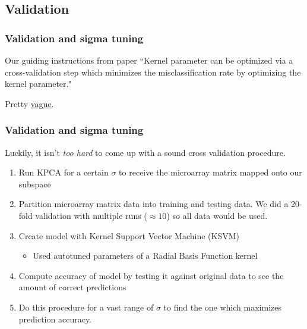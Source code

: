 \documentclass[serif]{beamer}
\begin{document}
	\subsection{Validation}
	\begin{frame}
		\frametitle{Validation and sigma tuning}
		\begin{block}{Our guiding instructions from paper}
		``Kernel parameter can be optimized via a cross-validation step 
		which minimizes the misclassification rate by optimizing the kernel parameter."
		\end{block}
		
		Pretty \underline{vague}.
	\end{frame}
	\begin{frame}
		\frametitle{Validation and sigma tuning}
		Luckily, it isn't \emph{too hard} to come up with a sound cross validation procedure.
		
		\begin{enumerate}
			\item Run KPCA for a certain $\sigma$ to receive the microarray matrix mapped onto our subspace
			\item Partition microarray matrix data into training and testing data. We did a 20-fold  validation with multiple runs ($\approx 10$) so all data would be used.
			\item Create model with Kernel Support Vector Machine (KSVM) 
			\begin{itemize}
				\item Used autotuned parameters of a Radial Basis Function kernel	
			\end{itemize}			
			\item Compute accuracy of model by testing it against original data to see the amount of correct predictions
			\item  Do this procedure for a vast range of $\sigma$ to find the one which maximizes prediction accuracy.
		\end{enumerate}
		
	\end{frame}
	
\end{document}
